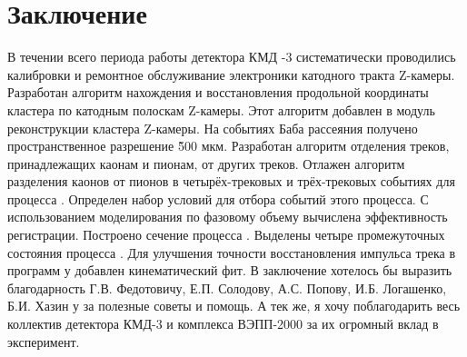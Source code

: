 \section{Заключение}


В течении всего периода работы детектора КМД -3 систематически проводились калибровки и ремонтное обслуживание электроники катодного тракта Z-камеры.
Разработан алгоритм нахождения и восстановления продольной координаты кластера по катодным полоскам Z-камеры. 
Этот алгоритм добавлен в модуль реконструкции кластера Z-камеры. 
На событиях Баба рассеяния получено пространственное разрешение \~500 мкм.
Разработан алгоритм отделения треков, принадлежащих каонам и пионам, от других треков.
Отлажен алгоритм разделения каонов от пионов в четырёх-трековых и трёх-трековых событиях для процесса .
Определен набор условий для отбора событий этого процесса.
С использованием моделирования по фазовому объему вычислена эффективность регистрации. Построено сечение процесса .
Выделены четыре промежуточных состояния процесса .
Для улучшения точности восстановления импульса трека в программ у добавлен кинематический фит.
В заключение хотелось бы выразить благодарность Г.В. Федотовичу, Е.П. Солодову, А.С. Попову, И.Б. Логашенко, Б.И. Хазин у за полезные советы и помощь.
А тек же, я хочу поблагодарить весь коллектив детектора КМД-3 и комплекса ВЭПП-2000 за их огромный вклад в эксперимент.
